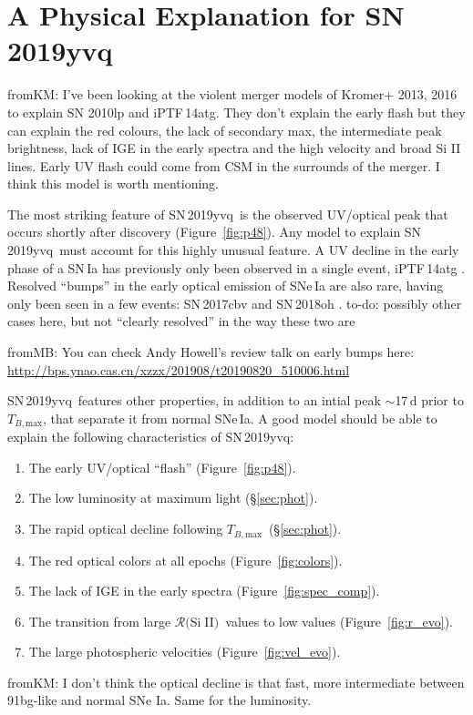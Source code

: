 \documentclass[twocolumn]{aastex63}
\def\ion#1#2{#1$\;${\footnotesize\rm{#2}}\relax}
\newcommand{\fromkate}[1]{{\color{brown} fromKM: {#1}}}
\newcommand{\frommb}[1]{{\color{purple} fromMB: {#1}}}
\newcommand{\todo}[1]{{\color{magenta} to-do: {#1}}}
\newcommand{\tbmax}{$T_{B,\mathrm{max}}$}
\newcommand{\RSiII}{$\mathcal{R}($\ion{Si}{II}$)$}
\newcommand{\sn}{SN\,2019yvq}
\begin{document}
\section{A Physical Explanation for \sn}\label{sec:models}

\fromkate{I've been looking at the violent merger models of Kromer+ 2013, 2016 to explain SN 2010lp and iPTF\,14atg. They don't explain the early flash but they can explain the red colours, the lack of secondary max, the intermediate peak brightness, lack of IGE in the early spectra and the high velocity and broad Si II lines. Early UV flash could come from CSM in the surrounds of the merger. I think this model is worth mentioning.}

The most striking feature of \sn\ is the observed UV/optical peak that occurs
shortly after discovery (Figure~\ref{fig:p48}). Any model to explain \sn\ must
account for this highly unusual feature. A UV decline in the early phase of a
SN\,Ia has previously only been observed in a single event, iPTF\,14atg
\citep{Cao15}. Resolved ``bumps'' in the early optical emission of SNe\,Ia are
also rare, having only been seen in a few events: SN\,2017cbv
\citep{Hosseinzadeh17} and SN\,2018oh \citep{Shappee19,Dimitriadis19}.
\todo{possibly other cases here, but not ``clearly resolved'' in the way these
two are}

\frommb{You can check Andy Howell's review talk on early bumps here: \url{http://bps.ynao.cas.cn/xzzx/201908/t20190820_510006.html}}

\sn\ features other properties, in addition to an intial peak $\sim$17\,d
prior to \tbmax, that separate it from normal SNe\,Ia. A good model should be
able to explain the following characteristics of \sn:
%
\begin{enumerate}
    \item The early UV/optical ``flash'' (Figure~\ref{fig:p48}).
    \item The low luminosity at maximum light (\S\ref{sec:phot}). 
    \item The rapid optical decline following \tbmax\ (\S\ref{sec:phot}). 
    \item The red optical colors at all epochs (Figure~\ref{fig:colors}). 
    \item The lack of IGE in the early spectra (Figure~\ref{fig:spec_comp}).
    \item The transition from large \RSiII\ values to low values (Figure~\ref{fig:r_evo}).
    \item The large photospheric velocities (Figure~\ref{fig:vel_evo}).
\end{enumerate}
%
\fromkate{I don't think the optical decline is that fast, more intermediate between 91bg-like and normal SNe Ia. Same for the luminosity. }
\end{document}
